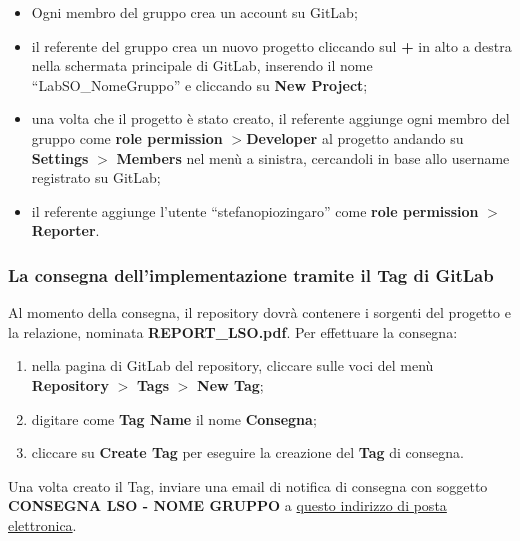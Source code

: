 \begin{tcolorbox}[colback=blue!20!white,colframe=blue!75!black,title=GitLab]
 \begin{itemize}
  \item Ogni membro del gruppo crea un account su GitLab;
  \item il referente del gruppo  crea un nuovo progetto cliccando sul \textbf{+} in alto a destra nella schermata principale di GitLab, inserendo il nome ``LabSO\_NomeGruppo'' e cliccando su \textbf{New Project};
  \item una volta che il progetto è stato creato, il referente aggiunge ogni membro del gruppo come \textbf{role permission} $>$\textbf{Developer} al progetto andando su \textbf{Settings} $>$ \textbf{Members} nel menù a sinistra, cercandoli in base allo username registrato su GitLab;
  \item il referente aggiunge l'utente ``stefanopiozingaro'' come \textbf{role permission} $>$ \textbf{Reporter}.
 \end{itemize}
\end{tcolorbox}

\subsubsection{La consegna dell'implementazione tramite il Tag di GitLab}

Al momento della consegna, il repository dovrà contenere i sorgenti del progetto
e la relazione, nominata \textbf{REPORT\_LSO.pdf}. Per effettuare la consegna:

\begin{enumerate}

 \item nella pagina di GitLab del repository, cliccare sulle voci del menù
       \textbf{Repository} $>$ \textbf{Tags} $>$ \textbf{New Tag};

 \item digitare come \textbf{Tag Name} il nome \textbf{Consegna};

 \item cliccare su \textbf{Create Tag} per eseguire la creazione del
       \textbf{Tag} di consegna.

\end{enumerate}

Una volta creato il Tag, inviare una email di notifica di consegna con soggetto
\textbf{CONSEGNA LSO - NOME GRUPPO} a
\href{mailto:stefanopio.zingaro@unibo.it}{questo indirizzo di posta
 elettronica}.

